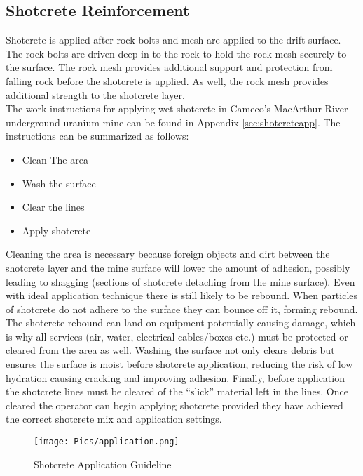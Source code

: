 \subsection{Shotcrete Reinforcement}

Shotcrete is applied after rock bolts and mesh are applied to the drift surface. The rock bolts are driven deep in to the rock to hold the rock mesh securely to the surface. The rock mesh provides additional support and protection from falling rock before the shotcrete is applied. As well, the rock mesh provides additional strength to the shotcrete layer.\\

The work instructions for applying wet shotcrete in Cameco's MacArthur River underground uranium mine can be found in Appendix \ref{sec:shotcreteapp}. The instructions can be summarized as follows:
\begin{itemize}
\item Clean The area
\item Wash the surface
\item Clear the lines
\item Apply shotcrete
\end{itemize}

Cleaning the area is necessary because foreign objects and dirt between the shotcrete layer and the mine surface will lower the amount of adhesion, possibly leading to shagging (sections of shotcrete detaching from the mine surface). Even with ideal application technique there is still likely to be rebound. When particles of shotcrete do not adhere to the surface they can bounce off it, forming rebound. The shotcrete rebound can land on equipment potentially causing damage, which is why all services (air, water, electrical cables/boxes etc.) must be protected or cleared from the area as well. Washing the surface not only clears debris but ensures the surface is moist before shotcrete application, reducing the risk of low hydration causing cracking and improving adhesion. Finally, before application the shotcrete lines must be cleared of the ``slick'' material left in the lines. Once cleared the operator can begin applying shotcrete provided they have achieved the correct shotcrete mix and application settings.\\

\begin{figure}
    \centering
    \texttt{[image: Pics/application.png]}
    \caption{Shotcrete Application Guideline \cite{camedoc}}
    \label{fig:instshot}
\end{figure}

